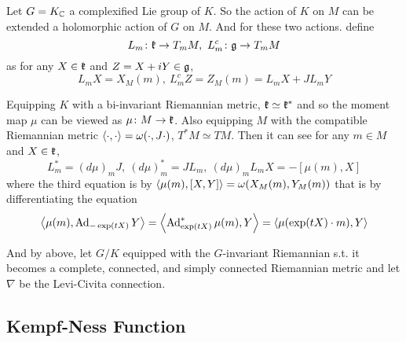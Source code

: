 \documentclass[a4paper,12pt]{article}
\begin{document}
	Let $G = K_{\mathbb{C}}$ a complexified Lie group of $K$. So the action of $K$ on $M$ can be extended a holomorphic action of $G$ on $M$. And for these two actions. define
	\begin{equation*}
		L_m \colon \mathfrak{k} \rightarrow T_mM,~L_m^c \colon \mathfrak{g} \rightarrow T_mM
	\end{equation*}
	as for any $X \in \mathfrak{k}$ and $Z = X+iY \in \mathfrak{g}$,
	\begin{equation*}
		L_mX = X_M(m),~L_m^cZ = Z_M(m) = L_mX + JL_{m}Y
	\end{equation*}
	
	Equipping $K$ with a bi-invariant Riemannian metric, $\mathfrak{k} \simeq \mathfrak{k}^*$ and so the moment map $\mu$ can be viewed as $\mu \colon M \rightarrow \mathfrak{k}$. Also equipping $M$ with the compatible Riemannian metric $\left\langle \cdot,\cdot \right\rangle = \omega(\cdot,J\cdot)$, $T^*M \simeq TM$. Then it can see for any $m \in M$ and $X \in \mathfrak{k}$,
	\begin{equation*}
		L_m^* = (d\mu)_mJ,~(d\mu)_m^* = JL_m,~(d\mu)_mL_mX = -[\mu(m),X]
	\end{equation*}
	where the third equation is by $\left\langle \mu(m),[X,Y] \right\rangle = \omega(X_M(m),Y_M(m))$ that is by differentiating the equation
	\begin{equation*}
		\left\langle \mu(m),\operatorname{Ad}_{-\exp(tX)}Y \right\rangle = \left\langle \operatorname{Ad}_{\exp(tX)}^*\mu(m),Y \right\rangle = \left\langle \mu(\exp(tX)\cdot m),Y \right\rangle
	\end{equation*}

	And by above, let $G / K$ equipped with the $G$-invariant Riemannian s.t. it becomes a complete, connected, and simply connected Riemannian metric and let $\nabla$ be the Levi-Civita connection.


	\subsection{Kempf-Ness Function}
\end{document}
